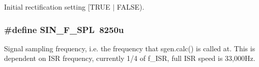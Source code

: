 Initial rectification setting \mbox{[}T\-R\-U\-E $|$ F\-A\-L\-S\-E). \hypertarget{a00033_a8d1689d7437a3410059f1f377ec63ebd}{
\subsubsection[{S\-I\-N\-\_\-\-F\-\_\-\-S\-P\-L}]{\setlength{\rightskip}{0pt plus 5cm}\#define S\-I\-N\-\_\-\-F\-\_\-\-S\-P\-L~8250u}}\label{a00033_a8d1689d7437a3410059f1f377ec63ebd}
Signal sampling frequency, i.\-e. the frequency that sgen.\-calc() is called at. This is dependent on I\-S\-R frequency, currently 1/4 of f\-\_\-\-I\-S\-R, full I\-S\-R speed is 33,000\-Hz. 

